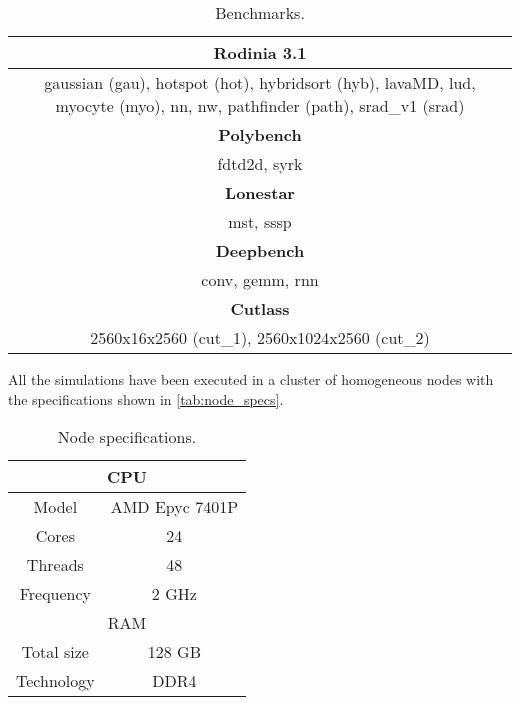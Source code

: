 \begin{table}
    \centering
    \begin{tabular}{ |c|  }
    \hline
    \textbf{Rodinia 3.1} \cite{rodinia} \\
    \hline
    \multirow{2}{=}{gaussian (gau), hotspot (hot), hybridsort (hyb), lavaMD, lud, myocyte (myo), nn, nw, pathfinder (path), srad\_v1 (srad)} \\
    \\
    \hline
    \textbf{Polybench} \cite{polybench} \\
    \hline
    \multirow{1}{=}{fdtd2d, syrk} \\
    \hline
    \textbf{Lonestar} \cite{lonestar} \\
    \hline
    \multirow{1}{=}{mst, sssp} \\
    \hline
    \textbf{Deepbench} \cite{deepbenchWeb} \\
    \hline
    \multirow{1}{=}{conv, gemm, rnn} \\
    \hline
    \textbf{Cutlass} \cite{cutlass} \\
    \hline
    \multirow{1}{=}{2560x16x2560 (cut\_1), 2560x1024x2560 (cut\_2)} \\
    \hline
    \end{tabular}
    \caption{Benchmarks.}
    \label{tab:benchmarks}
\end{table}

\par
All the simulations have been executed in a cluster of homogeneous nodes with the specifications shown in \autoref{tab:node_specs}.

\begin{table}
    \centering
    \begin{tabular}{ |c|c|  }
    \hline
    \multicolumn{2}{|c|}{CPU} \\
    \hline
    Model & AMD Epyc 7401P \\
    Cores & 24 \\
    Threads & 48 \\
    Frequency & 2 GHz \\
    \hline
    \multicolumn{2}{|c|}{RAM} \\
    \hline
    Total size & 128 GB \\
    Technology & DDR4 \\
    \hline
    \end{tabular}
    \caption{Node specifications.}
    \label{tab:node_specs}
\end{table}

